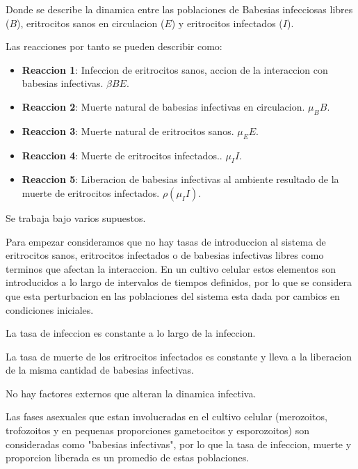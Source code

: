 \documentclass[11pt,a4paper]{article}
\begin{document}
Donde se describe la dinamica entre las poblaciones de Babesias infecciosas libres ($B$), eritrocitos sanos en circulacion ($E$) y eritrocitos infectados ($I$).

Las reacciones por tanto se pueden describir como:

\begin{itemize}
\item \textbf{Reaccion 1}: Infeccion de eritrocitos sanos, accion de la interaccion con babesias infectivas. $\beta BE$.
\item \textbf{Reaccion 2}: Muerte natural de babesias infectivas en circulacion. $\mu_B B$.
\item \textbf{Reaccion 3}: Muerte natural de eritrocitos sanos. $\mu_E E$.
\item \textbf{Reaccion 4}: Muerte de eritrocitos infectados.. $\mu_I I$.
\item \textbf{Reaccion 5}: Liberacion de babesias infectivas al ambiente resultado de la muerte de eritrocitos infectados. $\rho (\mu_I I)$.

\end{itemize}

Se trabaja bajo varios supuestos.

Para empezar consideramos que no hay tasas de introduccion al sistema de eritrocitos sanos, eritrocitos infectados o de babesias infectivas libres como terminos que afectan la interaccion. En un cultivo celular estos elementos son introducidos a lo largo de intervalos de tiempos definidos, por lo que se considera que esta perturbacion en las poblaciones del sistema esta dada por cambios en condiciones iniciales.

La tasa de infeccion es constante a lo largo de la infeccion.

La tasa de muerte de los eritrocitos infectados es constante y lleva a la liberacion de la misma cantidad de babesias infectivas.

No hay factores externos que alteran la dinamica infectiva.

Las fases asexuales que estan involucradas en el cultivo celular (merozoitos, trofozoitos y en pequenas proporciones gametocitos y esporozoitos) son consideradas como "babesias infectivas", por lo que la tasa de infeccion, muerte y proporcion liberada es un promedio de estas poblaciones.
\end{document}

